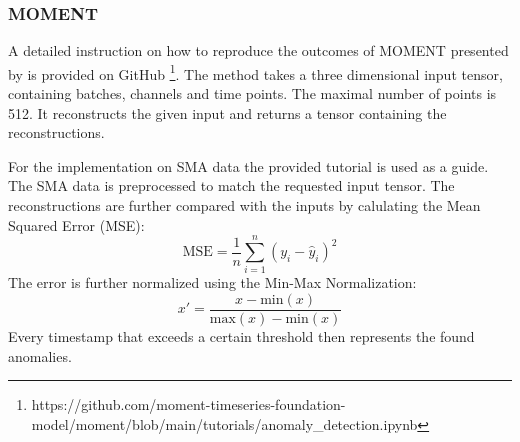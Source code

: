 \subsubsection{MOMENT}
A detailed instruction on how to reproduce the outcomes of MOMENT presented by \cite{goswami_moment_2024} is provided on GitHub \footnote{\fussy\tiny https://github.com/moment-timeseries-foundation-model/moment/blob/main/tutorials/anomaly\_detection.ipynb}. The method takes a three dimensional input tensor, containing batches, channels and time points. The maximal number of points is 512. It reconstructs the given input and returns a tensor containing the reconstructions.

For the implementation on SMA data the provided tutorial is used as a guide. The SMA data is preprocessed to match the requested input tensor. The reconstructions are further compared with the inputs by calulating the Mean Squared Error (MSE):
\begin{equation}
    \text{MSE} = \frac{1}{n} \sum_{i=1}^{n} \left( y_i - \hat{y}_i \right)^2
\end{equation}
The error is further normalized using the Min-Max Normalization:
\begin{equation}
x' = \frac{x - \text{min}(x)}{\text{max}(x) - \text{min}(x)}
\end{equation}
Every timestamp that exceeds a certain threshold then represents the found anomalies.

